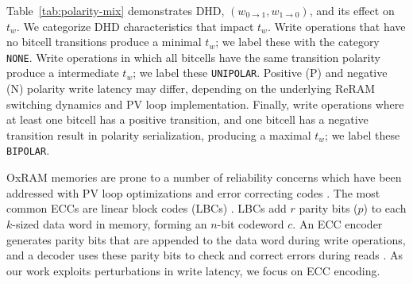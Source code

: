 Table~\ref{tab:polarity-mix} demonstrates DHD, $\left( w_{0\to1}, w_{1\to0} \right)$, and its effect on  $t_{w}$. 
We categorize DHD characteristics that impact $t_{w}$. 
Write operations that have no bitcell transitions produce a minimal $t_{w}$; we label these with the category \texttt{NONE}. 
Write operations in which all bitcells have the same transition polarity produce a intermediate $t_{w}$; we label these \texttt{UNIPOLAR}.
Positive (P) and negative (N) polarity write latency may differ, depending on the underlying ReRAM switching dynamics and PV loop implementation.
Finally, write operations where at least one bitcell has a positive transition, and one bitcell has a negative transition result in polarity serialization, producing a maximal $t_{w}$; we label these \texttt{BIPOLAR}.


OxRAM memories are prone to a number of reliability concerns which have been addressed with PV loop optimizations and error correcting codes \cite{hayakawa2017resolving, fukuyama2019comprehensive, crafton2021cim}. 
The most common ECCs are linear block codes (LBCs) \cite{hamming1950error}. 
LBCs add $r$ parity bits ($p$) to each $k$-sized data word in memory, forming an $n$-bit codeword $c$. An ECC encoder generates parity bits  that are appended to the data word during write operations, and a decoder uses these parity bits to check and correct errors during reads \cite{sklar2004abcs}. As our work exploits perturbations in write latency, we focus on ECC encoding.

